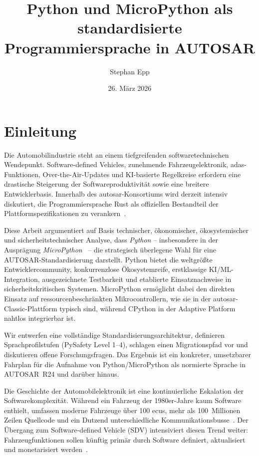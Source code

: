 ﻿\documentclass[12pt,a4paper,twoside]{article}
\title{\textbf{Python und MicroPython als standardisierte Programmiersprache in AUTOSAR}}
\author{Stephan Epp}
\date{26. März 2026}
\begin{document}
	
\maketitle
\tableofcontents
\clearpage

\section{Einleitung}
\label{sec:einleitung}
Die Automobilindustrie steht an einem tiefgreifenden softwaretechnischen Wendepunkt.
Software-defined Vehicles, zunehmende Fahrzeugelektronik, \gls{adas}-Funktionen,
Over-the-Air-Updates und KI-basierte Regelkreise erfordern eine drastische
Steigerung der Softwareproduktivität sowie eine breitere Entwicklerbasis.
Innerhalb des \gls{autosar}-Konsortiums wird derzeit intensiv diskutiert,
die Programmiersprache Rust als offiziellen Bestandteil der Plattformspezifikationen
zu verankern~\cite{autosar_rust_wp2023, rust_automotive_safety2022}.

Diese Arbeit argumentiert auf Basis technischer, ökonomischer, ökosystemischer und
sicherheitstechnischer Analyse, dass \emph{Python} -- insbesondere in der Ausprägung
\emph{MicroPython}~\cite{micropython_main} -- die strategisch überlegene Wahl für
eine AUTOSAR-Standardisierung darstellt.
Python bietet die weltgrößte Entwicklercommunity, konkurrenzlose
Ökosystemreife, erstklassige KI/ML-Integration, ausgezeichnete Testbarkeit
und etablierte Einsatznachweise in sicherheitskritischen Systemen.
MicroPython ermöglicht dabei den direkten Einsatz auf ressourcenbeschränkten
Mikrocontrollern, wie sie in der \gls{autosar}-Classic-Plattform typisch sind,
während CPython in der Adaptive Platform nahtlos integrierbar ist.

Wir entwerfen eine vollständige Standardisierungsarchitektur, definieren
Sprachprofilstufen (PySafety Level 1--4), schlagen einen Migrationspfad vor
und diskutieren offene Forschungsfragen. Das Ergebnis ist ein konkreter,
umsetzbarer Fahrplan für die Aufnahme von Python/MicroPython als normierte
Sprache in AUTOSAR~R24 und darüber hinaus.

Die Geschichte der Automobilelektronik ist eine kontinuierliche Eskalation
der Softwarekomplexität. Während ein Fahrzeug der 1980er-Jahre kaum
Software enthielt, umfassen moderne Fahrzeuge über 100 \glspl{ecu},
mehr als 100~Millionen Zeilen Quellcode und ein Dutzend unterschiedliche
Kommunikationsbusse~\cite{pretschner2007software, broy2006challenges}.
Der Übergang zum Software-defined Vehicle (SDV) intensiviert diesen Trend
weiter: Fahrzeugfunktionen sollen künftig primär durch Software definiert,
aktualisiert und monetarisiert werden~\cite{sdv_mckinsey2023, sdv_bosch2024}.
\end{document}

